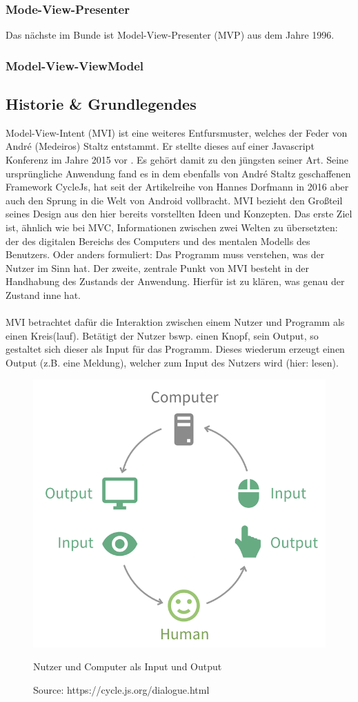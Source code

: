 \subsubsection{Mode-View-Presenter}
Das nächste im Bunde ist Model-View-Presenter (MVP) aus dem Jahre 1996.
\cite{modelViewPresenterTheTaligentMikePotel1996, modelViewPresenterMartinFowler2006}

\subsubsection{Model-View-ViewModel}

\subsection{Historie \& Grundlegendes}
Model-View-Intent (MVI) ist eine weiteres Entfursmuster, welches der Feder von André (Medeiros) Staltz entstammt. Er stellte dieses auf einer Javascript Konferenz im Jahre 2015 vor
\cite{modelViewIntentIntroduction}. Es gehört damit zu den jüngsten seiner Art.
Seine ursprüngliche Anwendung fand es in dem ebenfalls von André Staltz geschaffenen Framework CycleJs, hat seit der Artikelreihe von Hannes Dorfmann in 2016
\cite{modelViewIntentOnAndroidHannesDorfmann2016}
aber auch den Sprung in die Welt von Android vollbracht. MVI bezieht den Großteil seines Design aus den hier bereits vorstellten Ideen und Konzepten. Das erste Ziel ist, ähnlich wie bei MVC, Informationen zwischen zwei Welten zu übersetzten: der des digitalen Bereichs des Computers und des mentalen Modells des Benutzers. Oder anders formuliert: Das Programm muss verstehen, was der Nutzer im Sinn hat.
Der zweite, zentrale Punkt von MVI besteht in der Handhabung des Zustands der Anwendung. Hierfür ist zu klären, was genau der Zustand inne hat.
\\
\\
MVI betrachtet dafür die Interaktion zwischen einem Nutzer und Programm als einen Kreis(lauf). Betätigt der Nutzer bswp. einen Knopf, sein Output, so gestaltet sich dieser als Input für das Programm. Dieses wiederum erzeugt einen Output (z.B. eine Meldung), welcher zum Input des Nutzers wird (hier: lesen).
\begin{figure}[ht]
	\centering
	\includegraphics[height=0.5\textwidth]{./images/mvi-cycle}
	\caption{Nutzer und Computer als Input und Output}
	\caption*{Source: https://cycle.js.org/dialogue.html}
	\label{fig:userComputerInputOutput}
\end{figure}
